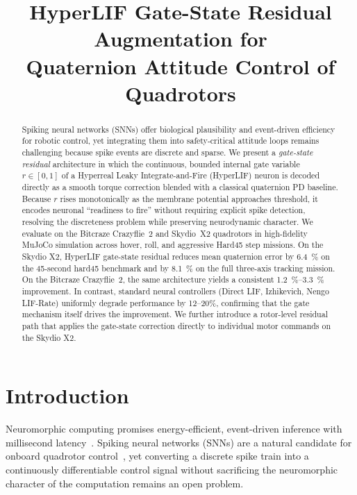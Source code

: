 \documentclass[conference]{IEEEtran}
\title{HyperLIF Gate-State Residual Augmentation for\\Quaternion Attitude Control of Quadrotors}
\author{
  \IEEEauthorblockN{Anonymous Author(s)}
  \IEEEauthorblockA{Affiliation withheld for review}
}
\begin{document}
\maketitle

\begin{abstract}
Spiking neural networks (SNNs) offer biological plausibility and event-driven
efficiency for robotic control, yet integrating them into safety-critical attitude
loops remains challenging because spike events are discrete and sparse.
We present a \emph{gate-state residual} architecture in which the continuous,
bounded internal gate variable~$r \in [0,1]$ of a Hyperreal Leaky
Integrate-and-Fire (HyperLIF) neuron is decoded directly as a smooth torque
correction blended with a classical quaternion PD baseline.
Because $r$ rises monotonically as the membrane potential approaches threshold,
it encodes neuronal ``readiness to fire'' without requiring explicit spike
detection, resolving the discreteness problem while preserving neurodynamic
character.
We evaluate on the Bitcraze Crazyflie~2 and Skydio~X2 quadrotors in
high-fidelity MuJoCo simulation across hover, roll, and aggressive Hard45 step
missions.
On the Skydio X2, HyperLIF gate-state residual reduces mean quaternion error
by \SI{6.4}{\percent} on the 45-second hard45 benchmark and by \SI{8.1}{\percent}
on the full three-axis tracking mission.
On the Bitcraze Crazyflie~2, the same architecture yields a consistent
\SI{1.2}{\percent}--\SI{3.3}{\percent} improvement.
In contrast, standard neural controllers (Direct LIF, Izhikevich, Nengo LIF-Rate)
uniformly degrade performance by 12--20\%, confirming that the gate mechanism
itself drives the improvement.
We further introduce a rotor-level residual path that applies the gate-state
correction directly to individual motor commands on the Skydio X2.
\end{abstract}

\section{Introduction}

Neuromorphic computing promises energy-efficient, event-driven inference with
millisecond latency~\cite{mahowald1991vlsi,furber2014spinnaker}.
Spiking neural networks (SNNs) are a natural candidate for onboard quadrotor
control~\cite{muller2022snn_uav}, yet converting a discrete spike train into a
continuously differentiable control signal without sacrificing the neuromorphic
character of the computation remains an open problem.
\end{document}
